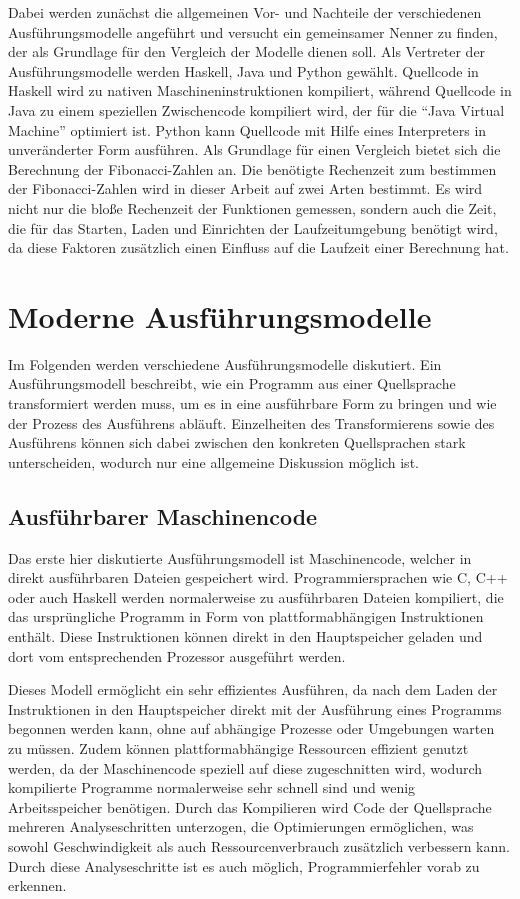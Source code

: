 \documentclass[11pt, parskip=half]{scrartcl}       %
\begin{document}
Dabei werden zunächst die allgemeinen Vor- und Nachteile der verschiedenen Ausführungsmodelle angeführt und versucht ein gemeinsamer Nenner zu finden, der als Grundlage für den Vergleich der Modelle dienen soll.
Als Vertreter der Ausführungsmodelle werden Haskell, Java und Python gewählt.
Quellcode in Haskell wird zu nativen Maschineninstruktionen kompiliert, während Quellcode in Java zu einem speziellen Zwischencode kompiliert wird, der für die ``Java Virtual Machine'' optimiert ist.
Python kann Quellcode mit Hilfe eines Interpreters in unveränderter Form ausführen.
Als Grundlage für einen Vergleich bietet sich die Berechnung der Fibonacci-Zahlen an.
Die benötigte Rechenzeit zum bestimmen der Fibonacci-Zahlen wird in dieser Arbeit auf zwei Arten bestimmt.
Es wird nicht nur die bloße Rechenzeit der Funktionen gemessen, sondern auch die Zeit, die für das Starten, Laden und Einrichten der Laufzeitumgebung benötigt wird, da diese Faktoren zusätzlich einen Einfluss auf die Laufzeit einer Berechnung hat.


\section{Moderne Ausführungsmodelle}

Im Folgenden werden verschiedene Ausführungsmodelle diskutiert.
Ein Ausführungsmodell beschreibt, wie ein Programm aus einer Quellsprache transformiert werden muss, um es in eine ausführbare Form zu bringen und wie der Prozess des Ausführens abläuft.\cite{execution_systems}
Einzelheiten des Transformierens sowie des Ausführens können sich dabei zwischen den konkreten Quellsprachen stark unterscheiden, wodurch nur eine allgemeine Diskussion möglich ist.

\subsection{Ausführbarer Maschinencode}

Das erste hier diskutierte Ausführungsmodell ist Maschinencode, welcher in direkt ausführbaren Dateien gespeichert wird.
Programmiersprachen wie C, C++ oder auch Haskell werden normalerweise zu ausführbaren Dateien kompiliert, die das ursprüngliche Programm in Form von plattformabhängigen Instruktionen enthält.
Diese Instruktionen können direkt in den Hauptspeicher geladen und dort vom entsprechenden Prozessor ausgeführt werden.

Dieses Modell ermöglicht ein sehr effizientes Ausführen, da nach dem Laden der Instruktionen in den Hauptspeicher direkt mit der Ausführung eines Programms begonnen werden kann, ohne auf abhängige Prozesse oder Umgebungen warten zu müssen.
Zudem können plattformabhängige Ressourcen effizient genutzt werden, da der Maschinencode speziell auf diese zugeschnitten wird, wodurch kompilierte Programme normalerweise sehr schnell sind und wenig Arbeitsspeicher benötigen.
Durch das Kompilieren wird Code der Quellsprache mehreren Analyseschritten\cite{advanced_compiler_design} unterzogen, die Optimierungen ermöglichen, was sowohl Geschwindigkeit als auch Ressourcenverbrauch zusätzlich verbessern kann.
Durch diese Analyseschritte ist es auch möglich, Programmierfehler vorab zu erkennen.
\end{document}
